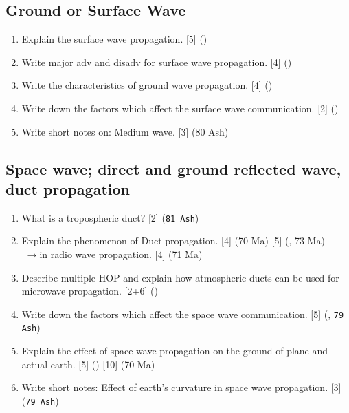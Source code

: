 \documentclass[12pt]{article}
\newcommand{\lb}{\\$\left|\rightarrow\right.$}
\begin{document}
  \subsection{Ground or Surface Wave}
    \begin{enumerate}
      \item Explain the surface wave propagation. \hfill [5] ()
        
      \item Write major adv and disadv for surface wave propagation. \hfill [4] ()

      \item Write the characteristics of ground wave propagation. \hfill [4] ()

      \item Write down the factors which affect the surface wave communication. \hfill [2] ()

      \item Write short notes on: Medium wave. \hfill [3] (80 Ash)
    \end{enumerate}
  
  \subsection{Space wave; direct and ground reflected wave, duct propagation}
    \begin{enumerate}
      \item What is a tropospheric duct? \hfill [2] (\texttt{81 Ash})

      \item Explain the phenomenon of Duct propagation. \hfill [4] (70 Ma) [5] (, 73 Ma)
        \lb in radio wave propagation. \hfill [4] (71 Ma)

      \item Describe multiple HOP and explain how atmospheric ducts can be used for microwave propagation. \hfill [2+6] ()

      \item Write down the factors which affect the space wave communication. \hfill [5] (, \texttt{79 Ash})

      \item Explain the effect of space wave propagation on the ground of plane and actual earth. \hfill [5] () [10] (70 Ma)

      \item Write short notes: Effect of earth's curvature in space wave propagation. \hfill [3] (\texttt{79 Ash})
    \end{enumerate}
\end{document}

